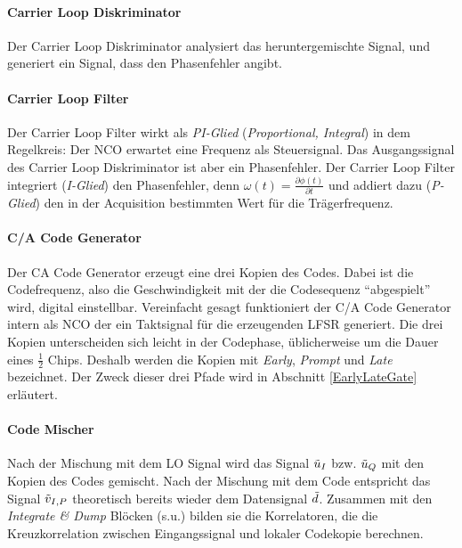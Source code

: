 \paragraph{Carrier Loop Diskriminator} Der Carrier Loop Diskriminator analysiert das heruntergemischte Signal, und generiert ein Signal, dass den Phasenfehler angibt.

\paragraph{Carrier Loop Filter} Der Carrier Loop Filter wirkt als \emph{PI-Glied} (\emph{Proportional, Integral}) in dem Regelkreis: Der NCO erwartet eine Frequenz als Steuersignal. Das Ausgangssignal des Carrier Loop Diskriminator ist aber ein Phasenfehler. Der Carrier Loop Filter integriert (\emph{I-Glied}) den Phasenfehler, denn $\omega(t)=\frac{\partial \phi(t)}{\partial t}$ und addiert dazu (\emph{P-Glied}) den in der Acquisition bestimmten Wert für die Trägerfrequenz.

\paragraph{C/A Code Generator} Der \gls{CA} Code Generator erzeugt eine drei Kopien des Codes. Dabei ist die Codefrequenz, also die Geschwindigkeit mit der die Codesequenz \enquote{abgespielt} wird, digital einstellbar. Vereinfacht gesagt  funktioniert der C/A Code Generator intern als \gls{NCO} der ein Taktsignal für die erzeugenden \gls{LFSR} generiert. Die drei Kopien unterscheiden sich leicht in der Codephase, üblicherweise um die Dauer eines $\frac{1}{2}$ Chips. Deshalb werden die Kopien mit \emph{Early}, \emph{Prompt} und \emph{Late} bezeichnet. Der Zweck dieser drei Pfade wird in Abschnitt \ref{EarlyLateGate} erläutert.

\paragraph{Code Mischer} Nach der Mischung mit dem LO Signal wird das Signal $\tilde{u}_I$ bzw. $\tilde{u}_Q$ mit den Kopien des Codes gemischt. Nach der Mischung mit dem Code entspricht das Signal $\tilde{v}_{I,P}$ theoretisch bereits wieder dem Datensignal $\tilde{d}$. Zusammen mit den \emph{Integrate \& Dump} Blöcken (s.u.) bilden sie die Korrelatoren, die die Kreuzkorrelation zwischen Eingangssignal und lokaler Codekopie berechnen.

